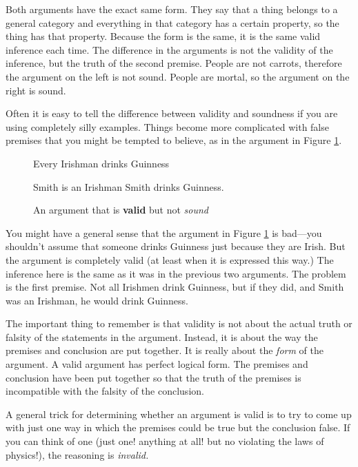 Both arguments have the exact same form. They say that a thing belongs to a general category and everything in that category has a certain property, so the thing has that property. Because the form is the same, it is the same valid inference each time. The difference in the arguments is not the validity of the inference, but the truth of the second premise. People are not carrots, therefore the argument on the left is not sound. People are mortal, so the argument on the right is sound.

Often it is easy to tell the difference between validity and soundness if you are using completely silly examples. Things become more complicated with false premises that you might be tempted to believe, as in the argument in Figure \ref{fig:valid_unsound}.

\begin{figure}
\begin{mdframed}[style=mytablehalfbox]
\begin{earg*}
\item Every Irishman drinks Guinness
\item Smith is an Irishman
\itemc Smith drinks Guinness.
\end{earg*}
\end{mdframed}
\caption{An argument that is \textbf{valid} but not \textit{sound}} \label{fig:valid_unsound}
\end{figure}


You might have a general sense that the argument in Figure \ref{fig:valid_unsound} is bad---you shouldn't assume that someone drinks Guinness just because they are Irish. But the argument is completely valid (at least when it is expressed this way.) The inference here is the same as it was in the previous two arguments. The problem is the first premise. Not all Irishmen drink Guinness, but if they did, and Smith was an Irishman, he would drink Guinness.

The important thing to remember is that validity is not about the actual truth or falsity of the statements in the argument. Instead, it is about the way the premises and conclusion are put together. It is really about the \emph{form} of the argument. A valid argument has perfect logical form. The premises and conclusion have been put together so that the truth of the premises is incompatible with the falsity of the conclusion.

A general trick for determining whether an argument is valid is to try to come up with just one way in which the premises could be true but the conclusion false. If you can think of one (just one! anything at all! but no violating the laws of physics!), the reasoning is \textit {invalid.}


